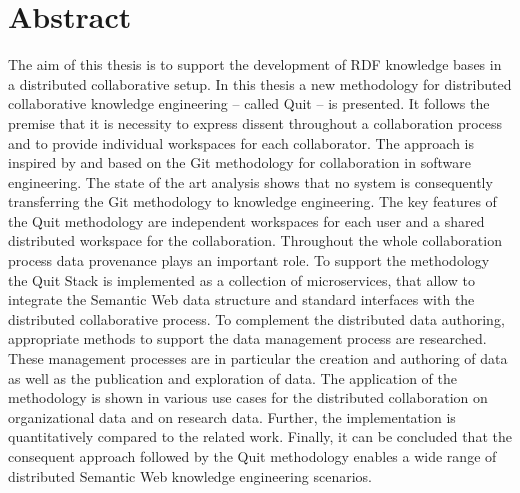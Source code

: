 \section*{Abstract}
The aim of this thesis is to support the development of RDF knowledge bases in a distributed collaborative setup.
In this thesis a new methodology for distributed collaborative knowledge engineering – called Quit – is presented.
It follows the premise that it is necessity to express dissent throughout a collaboration process and to provide individual workspaces for each collaborator.
The approach is inspired by and based on the Git methodology for collaboration in software engineering.
The state of the art analysis shows that no system is consequently transferring the Git methodology to knowledge engineering.
The key features of the Quit methodology are independent workspaces for each user and a shared distributed workspace for the collaboration.
Throughout the whole collaboration process data provenance plays an important role.
To support the methodology the Quit Stack is implemented as a collection of microservices, that allow to integrate the Semantic Web data structure and standard interfaces with the distributed collaborative process.
To complement the distributed data authoring, appropriate methods to support the data management process are researched.
These management processes are in particular the creation and authoring of data as well as the publication and exploration of data.
The application of the methodology is shown in various use cases for the distributed collaboration on organizational data and on research data.
Further, the implementation is quantitatively compared to the related work.
Finally, it can be concluded that the consequent approach followed by the Quit methodology enables a wide range of distributed Semantic Web knowledge engineering scenarios.




